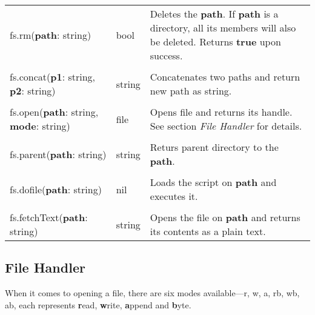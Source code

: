 \begin{tabularx}{\textwidth}{l l X}
	fs.rm(\textbf{path}: string) & bool & Deletes the \textbf{path}. If \textbf{path} is a directory, all its members will also be deleted. Returns \textbf{true} upon success.
	\\ \\
	fs.concat(\textbf{p1}: string, \textbf{p2}: string) & string & Concatenates two paths and return new path as string.
	\\ \\
	fs.open(\textbf{path}: string, \textbf{mode}: string) & file & Opens file and returns its handle. See section \emph{File Handler} for details.
	\\ \\
	fs.parent(\textbf{path}: string) & string & Returs parent directory to the \textbf{path}.
	\\ \\
	fs.dofile(\textbf{path}: string) & nil & Loads the script on \textbf{path} and executes it.
	\\ \\
	fs.fetchText(\textbf{path}: string) & string & Opens the file on \textbf{path} and returns its contents as a plain text.
\end{tabularx}

\subsection{File Handler}

When it comes to opening a file, there are six modes available---r, w, a, rb, wb, ab, each represents \textbf{r}ead, \textbf{w}rite, \textbf{a}ppend and \textbf{b}yte.


